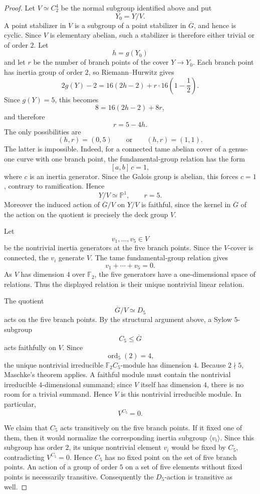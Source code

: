 \documentclass[11pt]{amsart}
\theoremstyle{remark}
\newcommand{\F}{\mathbb F}
\newcommand{\PP}{\mathbb P}
\begin{document}
\begin{proof}
Let $V\simeq C_2^4$ be the normal subgroup identified above and put
\[
Y_0=Y/V.
\]
A point stabilizer in $V$ is a subgroup of a point stabilizer in
$\overline G$, and hence is cyclic. Since $V$ is elementary abelian,
such a stabilizer is therefore either trivial or of order $2$. Let
\[
h=g(Y_0)
\]
and let $r$ be the number of branch points of the cover
$Y\to Y_0$. Each branch point has inertia group of order $2$, so
Riemann--Hurwitz gives
\[
2g(Y)-2
=
16(2h-2)+r\cdot16\left(1-\frac12\right).
\]
Since $g(Y)=5$, this becomes
\[
8=16(2h-2)+8r,
\]
and therefore
\[
r=5-4h.
\]
The only possibilities are
\[
(h,r)=(0,5)\qquad\text{or}\qquad(h,r)=(1,1).
\]
The latter is impossible. Indeed, for a connected tame abelian cover
of a genus-one curve with one branch point, the fundamental-group
relation has the form
\[
[a,b]\,c=1,
\]
where $c$ is an inertia generator. Since the Galois group is abelian,
this forces $c=1$, contrary to ramification. Hence
\[
Y/V\simeq\PP^1,\qquad r=5.
\]
Moreover the induced action of $\overline G/V$ on $Y/V$ is faithful,
since the kernel in $\overline G$ of the action on the quotient is
precisely the deck group $V$.

Let
\[
v_1,\ldots,v_5\in V
\]
be the nontrivial inertia generators at the five branch points. Since
the $V$-cover is connected, the $v_i$ generate $V$. The tame
fundamental-group relation gives
\[
v_1+\cdots+v_5=0.
\]
As $V$ has dimension $4$ over $\F_2$, the five generators have a
one-dimensional space of relations. Thus the displayed relation is
their unique nontrivial linear relation.

The quotient
\[
\overline G/V\simeq D_5
\]
acts on the five branch points. By the structural argument above, a Sylow
$5$-subgroup
\[
C_5\le\overline G
\]
acts faithfully on $V$. Since
\[
\operatorname{ord}_5(2)=4,
\]
the unique nontrivial irreducible $\F_2C_5$-module has dimension $4$.
Because $2\nmid5$, Maschke's theorem applies.  A faithful module must
contain the nontrivial irreducible $4$-dimensional summand; since $V$
itself has dimension $4$, there is no room for a trivial summand.
Hence $V$ is this nontrivial irreducible module. In particular,
\[
V^{C_5}=0.
\]

We claim that $C_5$ acts transitively on the five branch points. If it
fixed one of them, then it would normalize the corresponding inertia
subgroup $\langle v_i\rangle$. Since this subgroup has order $2$, its
unique nontrivial element $v_i$ would be fixed by $C_5$, contradicting
$V^{C_5}=0$. Hence $C_5$ has no fixed point on the set of five branch
points. An action of a group of order $5$ on a set of five elements
without fixed points is necessarily transitive. Consequently the
$D_5$-action is transitive as well.


\end{proof}
\end{document}
